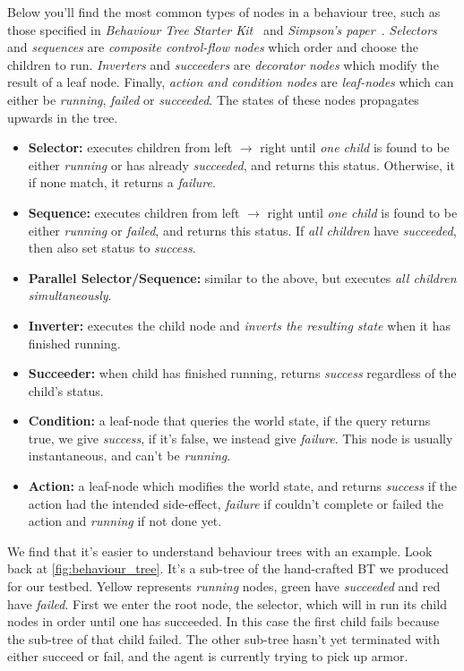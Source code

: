 \documentclass[a4paper, twocolumn]{article}
\begin{document}
        Below you'll find the most common types of nodes in a behaviour tree, such as those specified in \emph{Behaviour Tree Starter Kit}~\cite{champandard2014behaviour} and \emph{Simpson's paper}~\cite{simpson2014behavior}. \emph{Selectors} and \emph{sequences} are \emph{composite control-flow nodes} which order and choose the children to run. \emph{Inverters} and \emph{succeeders} are \emph{decorator nodes} which modify the result of a leaf node. Finally, \emph{action and condition nodes} are \emph{leaf-nodes} which can either be \emph{running}, \emph{failed} or \emph{succeeded}. The states of these nodes propagates upwards in the tree.

        \begin{itemize}
            \item{\textbf{Selector:} executes children from left \(\rightarrow\) right until \emph{one child} is found to be either \emph{running} or has already \emph{succeeded}, and returns this status. Otherwise, it if none match, it returns a \emph{failure}.}
            \item{\textbf{Sequence:} executes children from left \(\rightarrow\) right until \emph{one child} is found to be either \emph{running} or \emph{failed}, and returns this status. If \emph{all children} have \emph{succeeded}, then also set status to \emph{success}.}
            \item{\textbf{Parallel Selector/Sequence:} similar to the above, but executes \emph{all children simultaneously}.}
            \item{\textbf{Inverter:} executes the child node and \emph{inverts the resulting state} when it has finished running.}
            \item{\textbf{Succeeder:} when child has finished running, returns \emph{success} regardless of the child's status.}
            \item{\textbf{Condition:} a leaf-node that queries the world state, if the query returns true, we give \emph{success}, if it's false, we instead give \emph{failure}. This node is usually instantaneous, and can't be \emph{running}.}
            \item{\textbf{Action:} a leaf-node which modifies the world state, and returns \emph{success} if the action had the intended side-effect, \emph{failure} if couldn't complete or failed the action and \emph{running} if not done yet.}

        \end{itemize}

        We find that it's easier to understand behaviour trees with an example. Look back at \cref{fig:behaviour_tree}. It's a sub-tree of the hand-crafted BT we produced for our testbed. Yellow represents \emph{running} nodes, green have \emph{succeeded} and red have \emph{failed}. First we enter the root node, the selector, which will in run its child nodes in order until one has succeeded. In this case the first child fails because the sub-tree of that child failed. The other sub-tree hasn't yet terminated with either succeed or fail, and the agent is currently trying to pick up armor.
\end{document}
